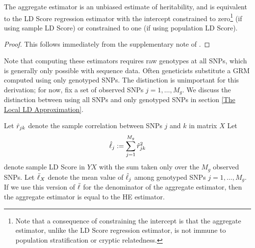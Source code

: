 \documentclass[11pt]{article}
\numberwithin{equation}{section}
\numberwithin{definition}{section}
\numberwithin{thm}{section}
\numberwithin{lemma}{section}
\numberwithin{prop}{section}
\numberwithin{cor}{section}
\numberwithin{hyp}{section}
\begin{document}
\begin{prop}\label{agg}

The aggregate estimator is an unbiased estimate of heritability, and is
equivalent to the LD Score regression estimator with the intercept constrained to zero\footnote{
Note that a consequence of constraining the intercept is that the aggregate estimator, 
unlike the LD Score regression estimator, is not immune to population stratification or cryptic relatedness.} (if using sample LD Score)
or constrained to one (if using population LD Score).

\end{prop}
\begin{proof}
This follows immediately from the supplementary note of \cite{buliksullivan2014}.
\end{proof}
Note that computing these estimators requires raw genotypes at all SNPs, 
which is generally only possible with sequence data.
Often geneticists substitute a GRM computed using only genotyped SNPs. 
The distinction is unimportant for this derivation; for now, fix a set of observed SNPs $j=1,\ldots,M_g$. 
We discuss the distinction between using all SNPs and only genotyped SNPs in section \ref{The Local LD Approximation}.

\begin{prop}\label{he_vs_agg}
Let $\hat{r}_{jk}$ denote the sample correlation between SNPs $j$ and $k$ in matrix $X$
Let 
$$\hat{\ell}_j := \sum_{j=1}^{M_g} \hat{r}_{jk}^2$$
denote sample LD Score in $YX$
with the sum taken only over the $M_g$ observed SNPs.
Let $\bar{\ell}_{X}$ denote the mean value of $\hat{\ell}_{j}$ among genotyped SNPs $j=1,\ldots,M_g$.
If we use this version of $\bar{\ell}$ for the denominator of the aggregate estimator, 
then the aggregate estimator is equal to the HE estimator. 
\end{prop}
\end{document}
